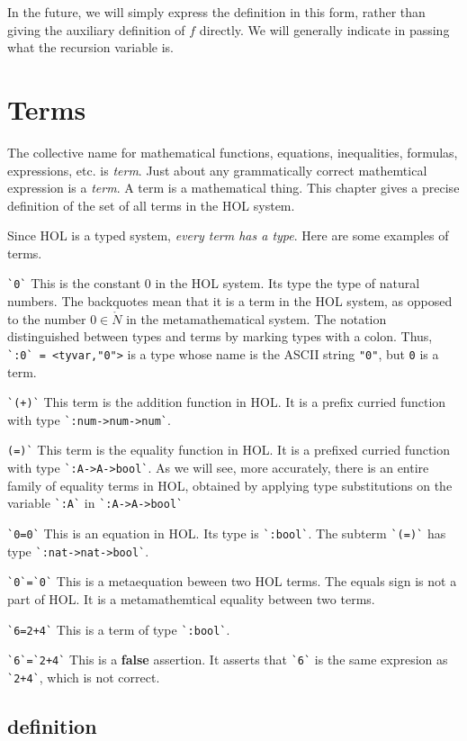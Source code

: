 In the future, we will simply express the definition in this form, rather than giving the auxiliary definition of $f$ directly.  We will generally indicate in passing what the recursion variable is.


\chapter{Terms}

The collective name for mathematical functions, equations, inequalities, formulas, expressions, etc. is {\it term}.  Just about any grammatically correct mathemtical expression is a {\it term}.  A term is a mathematical thing.  This chapter gives a precise definition of the set of all terms in the HOL system.

Since HOL is a typed system, {\it every term has a type}.
Here are some examples of terms.

\verb!`0`!  This is the constant $0$ in the HOL system.  Its type the type of natural numbers.  The backquotes mean that it is a term in the HOL system, as opposed to the number $0\in\ring{N}$ in the metamathematical system.  The notation distinguished between types and terms by marking types with a colon.  Thus, \verb!`:0` = <tyvar,"0">! is a type whose name is the ASCII string \verb!"0"!, but \verb`0` is a term.

\verb!`(+)`!  This term is the addition function in HOL.  It is a prefix curried function with type \verb!`:num->num->num`!.

\verb!(=)`!  This term is the equality function in HOL.  It is a prefixed curried function with type \verb!`:A->A->bool`!.  As we will see, more accurately, there is an entire family of equality terms in HOL, obtained by applying type substitutions on the variable \verb!`:A`! in \verb!`:A->A->bool`!

\verb!`0=0`!  This is an equation in HOL.  Its type is \verb!`:bool`!.  The subterm \verb!`(=)`! has type \verb!`:nat->nat->bool`!.

\verb!`0`=`0`!  This is a metaequation beween two HOL terms.  The equals sign is not a part of HOL.  It is a metamathemtical equality between two terms.

\verb!`6=2+4`!  This is a term of type \verb!`:bool`!.

\verb!`6`=`2+4`!  This is a {\bf false} assertion.  It asserts that \verb!`6`! is the same expresion as \verb!`2+4`!, which is not correct.  

\section{definition}

